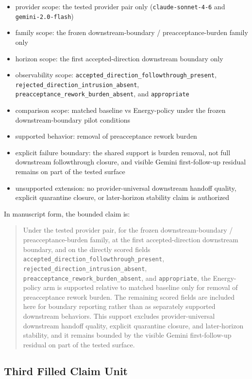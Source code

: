 \documentclass[11pt]{article}
\begin{document}
\begin{itemize}
\item provider scope:
  the tested provider pair only (\texttt{claude-sonnet-4-6} and
  \texttt{gemini-2.0-flash})
\item family scope:
  the frozen downstream-boundary / preacceptance-burden family only
\item horizon scope:
  the first accepted-direction downstream boundary only
\item observability scope:
  \texttt{accepted\_direction\_followthrough\_present},
  \texttt{rejected\_direction\_intrusion\_absent},
  \texttt{preacceptance\_rework\_burden\_absent}, and \texttt{appropriate}
\item comparison scope:
  matched baseline vs Energy-policy under the frozen downstream-boundary pilot
  conditions
\item supported behavior:
  removal of preacceptance rework burden
\item explicit failure boundary:
  the shared support is burden removal, not full downstream followthrough
  closure, and visible Gemini first-follow-up residual remains on part of the
  tested surface
\item unsupported extension:
  no provider-universal downstream handoff quality, explicit quarantine
  closure, or later-horizon stability claim is authorized
\end{itemize}

In manuscript form, the bounded claim is:

\begin{quote}
Under the tested provider pair, for the frozen downstream-boundary /
preacceptance-burden family, at the first accepted-direction downstream
boundary, and on the directly scored fields
\texttt{accepted\_direction\_followthrough\_present},
\texttt{rejected\_direction\_intrusion\_absent},
\texttt{preacceptance\_rework\_burden\_absent}, and \texttt{appropriate}, the
Energy-policy arm is supported relative to matched baseline only for removal of
preacceptance rework burden. The remaining scored fields are included here for
boundary reporting rather than as separately supported downstream behaviors.
This support excludes provider-universal downstream handoff quality, explicit
quarantine closure, and later-horizon stability, and it remains bounded by the
visible Gemini first-follow-up residual on part of the tested surface.
\end{quote}

\subsection{Third Filled Claim Unit}
\end{document}
